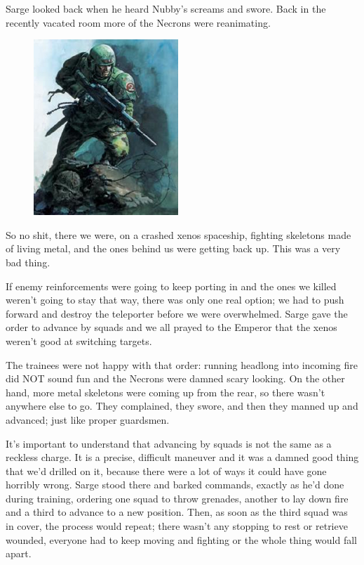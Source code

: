 Sarge looked back when he heard Nubby’s screams and swore. 
Back in the recently vacated room more of the Necrons were reanimating.

\begin{figure}
	\begin{center}
		\includegraphics[width=\figwidth]{pics/8/48.png}
	\end{center}
\end{figure}
So no shit, there we were, on a crashed xenos spaceship, fighting skeletons made of living metal, and the ones behind us were getting back up. 
This was a very bad thing.

If enemy reinforcements were going to keep porting in and the ones we killed weren’t going to stay that way, there was only one real option; 
we had to push forward and destroy the teleporter before we were overwhelmed. 
Sarge gave the order to advance by squads and we all prayed to the Emperor that the xenos weren’t good at switching targets.

The trainees were not happy with that order: 
running headlong into incoming fire did NOT sound fun and the Necrons were damned scary looking. 
On the other hand, more metal skeletons were coming up from the rear, so there wasn’t anywhere else to go. 
They complained, they swore, and then they manned up and advanced; 
just like proper guardsmen.

It’s important to understand that advancing by squads is not the same as a reckless charge. 
It is a precise, difficult maneuver and it was a damned good thing that we’d drilled on it, because there were a lot of ways it could have gone horribly wrong. 
Sarge stood there and barked commands, exactly as he’d done during training, ordering one squad to throw grenades, another to lay down fire and a third to advance to a new position. 
Then, as soon as the third squad was in cover, the process would repeat; 
there wasn’t any stopping to rest or retrieve wounded, everyone had to keep moving and fighting or the whole thing would fall apart.

